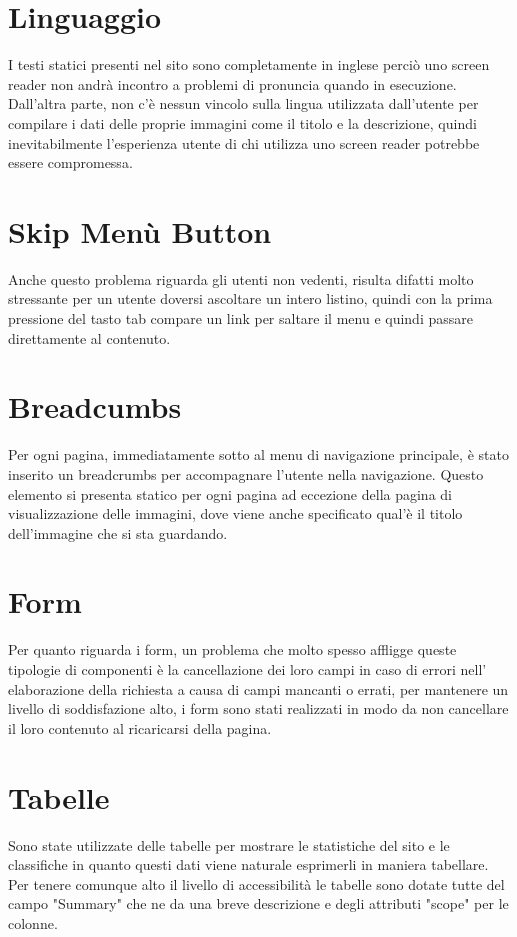 \documentclass[openany, a4paper, 12pt]{report}
\begin{document}
		\section{Linguaggio}
		I testi statici presenti nel sito sono completamente in inglese perciò uno screen reader non andrà incontro a problemi di pronuncia quando in esecuzione. Dall'altra parte, non c'è nessun vincolo sulla lingua utilizzata dall'utente per compilare i dati delle proprie immagini come il titolo e la descrizione, quindi inevitabilmente l'esperienza utente di chi utilizza uno screen reader potrebbe essere compromessa.
		\section{Skip Menù Button}
		Anche questo problema riguarda gli utenti non vedenti, risulta difatti molto stressante per un utente doversi ascoltare un intero listino, quindi con la prima pressione del tasto tab compare un link per saltare il menu e quindi passare direttamente al contenuto.
		\section{Breadcumbs}
		Per ogni pagina, immediatamente sotto al menu di navigazione principale, è stato inserito un breadcrumbs per accompagnare l'utente nella navigazione. Questo elemento si presenta statico per ogni pagina ad eccezione della pagina di visualizzazione delle immagini, dove viene anche specificato qual'è il titolo dell'immagine che si sta guardando.
		\section{Form}
	Per quanto riguarda i form, un problema che molto spesso affligge queste tipologie di componenti è la cancellazione dei loro campi in caso di errori nell' elaborazione della richiesta a causa di campi mancanti o errati, per mantenere un livello di soddisfazione alto, i form sono stati realizzati in modo da non cancellare il loro contenuto al ricaricarsi della pagina.
		\section{Tabelle}
		Sono state utilizzate delle tabelle per mostrare le statistiche del sito e le classifiche in quanto questi dati viene naturale esprimerli in maniera tabellare. Per tenere comunque alto il livello di accessibilità le tabelle sono dotate tutte del campo "Summary" che ne da una breve descrizione e degli attributi "scope" per le colonne.
\end{document}
